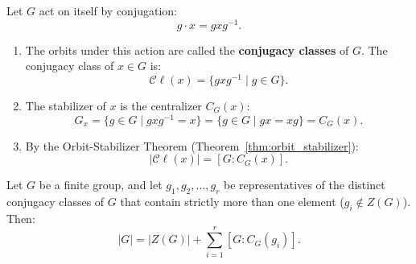 \begin{definition}
Let $G$ act on itself by conjugation:
\begin{equation}
g \cdot x = g x g^{-1}.
\end{equation}
\begin{enumerate}[label=\textbf{(\arabic*)}, leftmargin=*, itemsep=4pt]
    \item The orbits under this action are called the \textbf{conjugacy classes} of $G$. The conjugacy class of $x \in G$ is:
    \begin{equation}
    \mathcal{C}\ell(x) = \{ g x g^{-1} \mid g \in G \}.
    \end{equation}
    \item The stabilizer of $x$ is the centralizer $C_G(x)$:
    \begin{equation}
    G_x = \{ g \in G \mid gxg^{-1} = x \} = \{ g \in G \mid gx = xg \} = C_G(x).
    \end{equation}
    \item By the Orbit-Stabilizer Theorem (Theorem~\ref{thm:orbit_stabilizer}):
    \begin{equation}
    |\mathcal{C}\ell(x)| = [G : C_G(x)].
    \end{equation}
\end{enumerate}
\end{definition}

\begin{theorem}
\label{thm:class_equation}
Let $G$ be a finite group, and let $g_1, g_2, \dots, g_r$ be representatives of the distinct conjugacy classes of $G$ that contain strictly more than one element ($g_i \notin Z(G)$). Then:
\begin{equation}
|G| = |Z(G)| + \sum_{i=1}^r [G : C_G(g_i)].
\end{equation}
\end{theorem}

